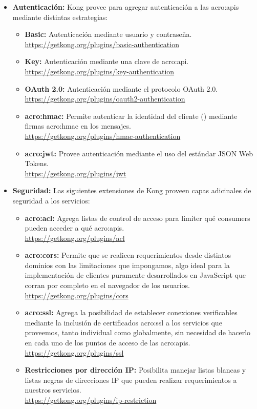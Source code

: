 \begin{itemize}
  \item \textbf{Autenticación:} Kong provee  para agregar autenticación a las \glspl{acro:api} mediante distintas estrategias:
  \begin{itemize}
    \item \textbf{Basic:} Autenticación mediante usuario y contraseña. \\
    \url{https://getkong.org/plugins/basic-authentication}
    \item \textbf{Key:} Autenticación mediante una clave de \gls{acro:api}. \\
    \url{https://getkong.org/plugins/key-authentication}
    \item \textbf{OAuth 2.0:} Autenticación mediante el protocolo OAuth 2.0. \\
    \url{https://getkong.org/plugins/oauth2-authentication}
    \item \textbf{\gls{acro:hmac}:} Permite autenticar la identidad del cliente () mediante firmas \gls{acro:hmac} en los mensajes. \\
    \url{https://getkong.org/plugins/hmac-authentication}
    \item \textbf{\gls{acro:jwt}:} Provee autenticación mediante el uso del estándar JSON Web Tokens. \\
    \url{https://getkong.org/plugins/jwt}
  \end{itemize}

  \item \textbf{Seguridad:} Las siguientes extensiones de Kong proveen capas adicinales de seguridad a los servicios:
  \begin{itemize}
    \item \textbf{\gls{acro:acl}:} Agrega listas de control de acceso para limiter qué consumers pueden acceder a qué \glspl{acro:api}. \\
    \url{https://getkong.org/plugins/acl}
    \item \textbf{\gls{acro:cors}:} Permite que se realicen requerimientos desde distintos dominios con las limitaciones que impongamos, algo ideal para la implementación de clientes puramente desarrollados en JavaScript que corran por completo en el navegador de los usuarios. \\
    \url{https://getkong.org/plugins/cors}
    \item \textbf{\gls{acro:ssl}:} Agrega la posibilidad de establecer conexiones verificables mediante la inclusión de certificados \gls{acro:ssl} a los servicios que proveemos, tanto individual como globalmente, sin necesidad de hacerlo en cada uno de los puntos de acceso de las \glspl{acro:api}. \\
    \url{https://getkong.org/plugins/ssl}
    \item \textbf{Restricciones por dirección IP:} Posibilita manejar listas blancas y listas negras de direcciones IP que pueden realizar requerimientos a nuestros servicios. \\
    \url{https://getkong.org/plugins/ip-restriction}
  \end{itemize}


\end{itemize}
